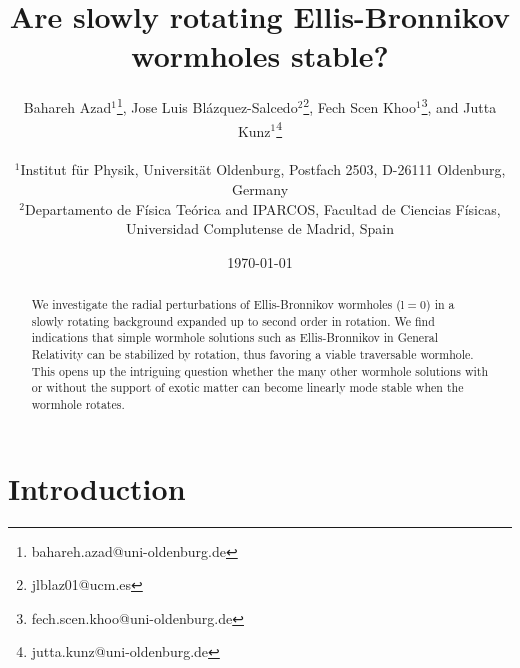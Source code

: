 \documentclass{article}
\date{\today}
\begin{document}
 

\title{
\Large{\bf 
Are slowly rotating Ellis-Bronnikov wormholes stable?
}
}
 \vspace{1.5truecm}



\author{
{\large }%
{ Bahareh Azad}$^{1}$\footnote{bahareh.azad@uni-oldenburg.de}, 
{ Jose Luis Bl\'azquez-Salcedo}$^{2}$\footnote{jlblaz01@ucm.es},
{ Fech Scen Khoo}$^{1}$\footnote{fech.scen.khoo@uni-oldenburg.de},
and
{ Jutta Kunz}$^{1}$\footnote{jutta.kunz@uni-oldenburg.de}
\\
\\
$^{1}${\small  Institut f\"ur  Physik, Universit\"at Oldenburg, Postfach 2503,
D-26111 Oldenburg, Germany}
\\
$^{2}${\small  Departamento de F\'isica Te\'orica and IPARCOS, 
Facultad de Ciencias F\'isicas, Universidad Complutense de Madrid, Spain} 
}


\maketitle

 
\begin{abstract}
We investigate the radial perturbations of Ellis-Bronnikov wormholes ($\mathrm{l}=0$) in a slowly rotating background expanded up to second order in rotation.
We find indications that simple wormhole solutions such as Ellis-Bronnikov in General Relativity can be stabilized by rotation, thus favoring a viable traversable wormhole. 
This opens up the intriguing question whether the many other wormhole solutions with or without the support of exotic matter can become linearly mode stable when the wormhole rotates.
%
\end{abstract}



\section{Introduction}
\end{document}
